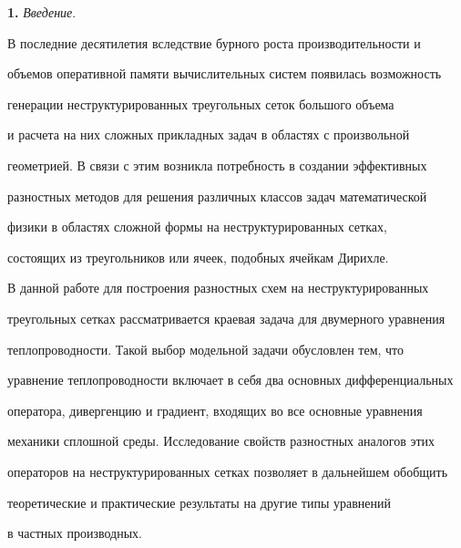 

\maketitle


\label{begin}











{\bf 1.} {\it Введение}.


В последние десятилетия вследствие бурного роста производительности и


объемов оперативной памяти вычислительных систем появилась возможность


генерации неструктурированных треугольных сеток большого объема


и расчета на них сложных прикладных задач в областях с произвольной


геометрией. В связи с этим возникла потребность в создании эффективных


разностных методов для решения различных классов задач математической


физики в областях сложной формы на неструктурированных сетках,


состоящих из треугольников или ячеек, подобных ячейкам Дирихле.





В данной работе для построения разностных схем на неструктурированных


треугольных сетках рассматривается краевая задача для двумерного уравнения


теплопроводности. Такой выбор модельной задачи обусловлен тем, что


уравнение теплопроводности включает в себя два основных дифференциальных


оператора, дивергенцию и градиент, входящих во все основные уравнения


механики сплошной среды. Исследование свойств разностных аналогов этих


операторов на неструктурированных сетках позволяет в дальнейшем обобщить


теоретические и практические результаты на другие типы уравнений


в частных производных.





